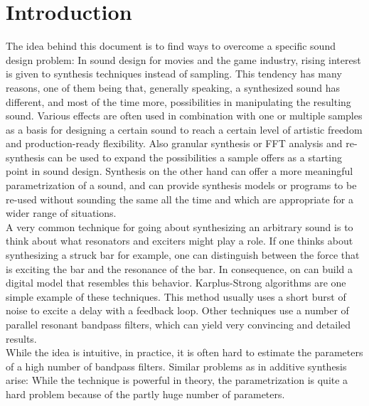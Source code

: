 \chapter{Introduction}
\label{sec:introduction}

The idea behind this document is to find ways to overcome a specific sound design problem: In sound design for movies and the game industry, rising interest is given to synthesis techniques instead of sampling. This tendency has many reasons, one of them being that, generally speaking, a synthesized sound has different, and most of the time more, possibilities in manipulating the resulting sound. Various effects are often used in combination with one or multiple  samples as a basis for designing a certain sound to reach a certain level of artistic freedom and production-ready flexibility. Also granular synthesis or FFT analysis and re-synthesis can be used to expand the possibilities a sample offers as a starting point in sound design. Synthesis on the other hand can offer a more meaningful parametrization of a sound, and can provide synthesis models or programs to be re-used without sounding the same all the time and which are appropriate for a wider range of situations. \\

A very common technique for going about synthesizing an arbitrary sound is to think about what resonators and exciters might play a role. If one thinks about synthesizing a struck bar for example, one can distinguish between the force that is exciting the bar and the resonance of the bar. In consequence, on can build a digital model that resembles this behavior. Karplus-Strong algorithms are one simple example of these techniques. This method usually uses a short burst of noise to excite a delay with a feedback loop. Other techniques use a number of parallel resonant bandpass filters, which can yield very convincing and detailed results. \\

While the idea is intuitive, in practice, it is often hard to estimate the parameters of a high number of bandpass filters. Similar problems as in additive synthesis arise: While the technique is powerful in theory, the parametrization is quite a hard problem because of the partly huge number of parameters. 


